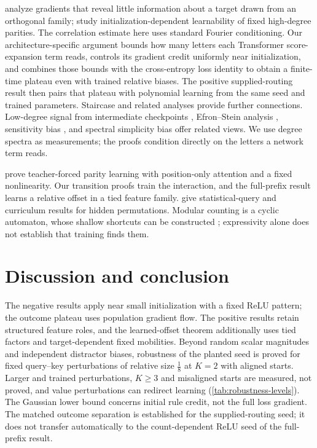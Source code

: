 \citet{shalevshwartz2017failures} analyze gradients that reveal little information
about a target drawn from an orthogonal family; \citet{abbe2025parities} study
initialization-dependent learnability of fixed high-degree parities.
The correlation estimate here uses standard Fourier conditioning. Our architecture-specific
argument bounds how many letters each Transformer score-expansion term reads, controls
its gradient credit uniformly near initialization, and combines those bounds with the
cross-entropy loss identity to obtain a finite-time plateau even with trained relative biases.
The positive supplied-routing result then pairs that plateau with polynomial learning
from the same seed and trained parameters. Staircase and related analyses
\citep{abbe2021staircase,abbe2022mergedstaircase,abbe2023sgd} provide further connections.
Low-degree signal from intermediate checkpoints \citep{panigrahi2025progressive}, Efron--Stein
analysis \citep{li2025noise}, sensitivity bias \citep{hahn2024sensitive}, and spectral simplicity
bias \citep{yang2019spectral} offer related views. We use degree spectra as measurements;
the proofs condition directly on the letters a network term reads.

\citet{kim2024parity} prove teacher-forced parity learning with position-only attention and a fixed
nonlinearity. Our transition proofs train the interaction, and the full-prefix result learns a
relative offset in a tied feature family. \citet{wang2025compositional} give statistical-query
and curriculum results for hidden permutations. Modular counting is a cyclic automaton,
whose shallow shortcuts can be constructed \citep{liu2023automata}; expressivity alone does
not establish that training finds them.

\section{Discussion and conclusion}
\label{sec:conclusion}
\label{sec:discussion}

The negative results apply near small initialization with a fixed ReLU pattern; the outcome
plateau uses population gradient flow. The positive results retain structured feature roles,
and the learned-offset theorem additionally uses tied factors and target-dependent fixed
mobilities. Beyond random scalar magnitudes and independent distractor biases, robustness of the planted seed is proved for
fixed query--key perturbations of relative size $\frac18$ at $K=2$ with aligned starts. Larger and trained perturbations,
$K\ge3$ and misaligned starts are measured, not proved, and value perturbations can redirect learning
(\cref{tab:robustness-levels}). The Gaussian lower bound concerns initial rule credit, not the full loss gradient.
The matched outcome separation is established for the supplied-routing seed; it does not
transfer automatically to the count-dependent ReLU seed of the full-prefix result.

